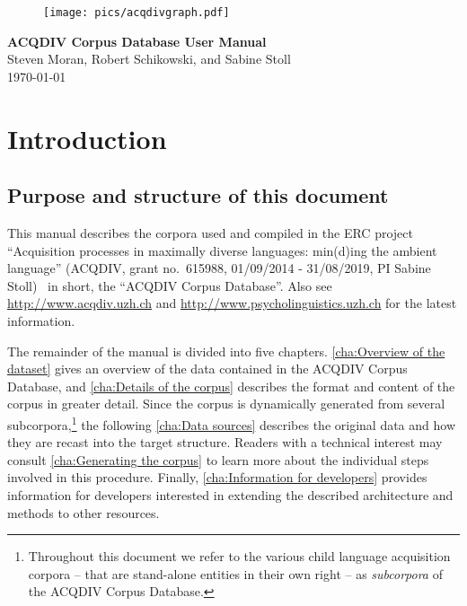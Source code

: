 \documentclass[a4paper, 11pt]{book}
\begin{document}


\begin{center}
	
	\begin{figure}[h!]
		\vspace{2.4cm}
		\texttt{[image: pics/acqdivgraph.pdf]}
		\vspace{0.5cm}
	\end{figure}

	\Huge{\textbf{ACQDIV Corpus Database User Manual}\\[0.5cm]}
	\LARGE{Steven Moran, Robert Schikowski, and Sabine Stoll}\\
	\today

\end{center}

\tableofcontents
\listoffigures
\listoftables


\chapter{Introduction}

\section{Purpose and structure of this document}


This manual describes the corpora used and compiled in the ERC project “Acquisition processes in maximally diverse languages: min(d)ing the ambient language” (ACQDIV, grant no.\ 615988, 01/09/2014 - 31/08/2019, PI Sabine Stoll) \textendash\ in short, the “ACQDIV Corpus Database”. Also see \url{http://www.acqdiv.uzh.ch} and \url{http://www.psycholinguistics.uzh.ch} for the latest information. 

The remainder of the manual is divided into five chapters. \autoref{cha:Overview of the dataset} gives an overview of the data contained in the ACQDIV Corpus Database, and \autoref{cha:Details of the corpus} describes the format and content of the corpus in greater detail. Since the corpus is dynamically generated from several subcorpora,\footnote{Throughout this document we refer to the various child language acquisition corpora -- that are stand-alone entities in their own right -- as \textit{subcorpora} of the ACQDIV Corpus Database.} the following \autoref{cha:Data sources} describes the original data and how they are recast into the target structure. Readers with a technical interest may consult \autoref{cha:Generating the corpus} to learn more about the individual steps involved in this procedure. Finally, \autoref{cha:Information for developers} provides information for developers interested in extending the described architecture and methods to other resources.
\end{document}
